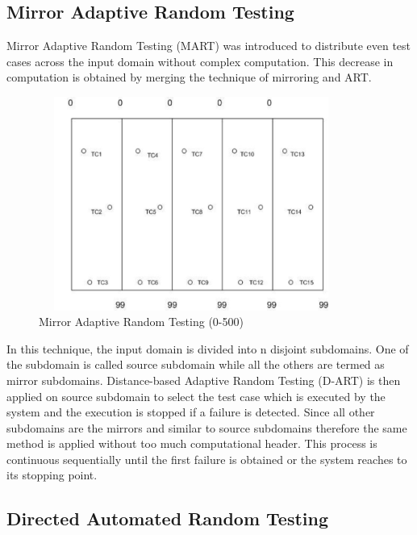 \subsection{Mirror Adaptive Random Testing}
Mirror Adaptive Random Testing (MART) \cite{Chen2003} was introduced to distribute even test cases across the input domain without complex computation. This decrease in computation is obtained by merging the technique of mirroring and ART.

\begin{figure}[h]
\begin{center}
	\includegraphics[width=10cm, height=7cm ]{Literature/mat}
	\caption{Mirror Adaptive Random Testing (0-500)}
\end{center}  
\end{figure}

In this technique, the input domain is divided into n disjoint subdomains. One of the subdomain is called source subdomain while all the others are termed as mirror subdomains. Distance-based Adaptive Random Testing (D-ART) is then applied on source subdomain to select the test case which is executed by the system and the execution is stopped if a failure is detected. Since all other subdomains are the mirrors and similar to source subdomains therefore the same method is applied without too much computational header. This process is continuous sequentially until the first failure is obtained or the system reaches to its stopping point.

\subsection{Directed Automated Random Testing}


